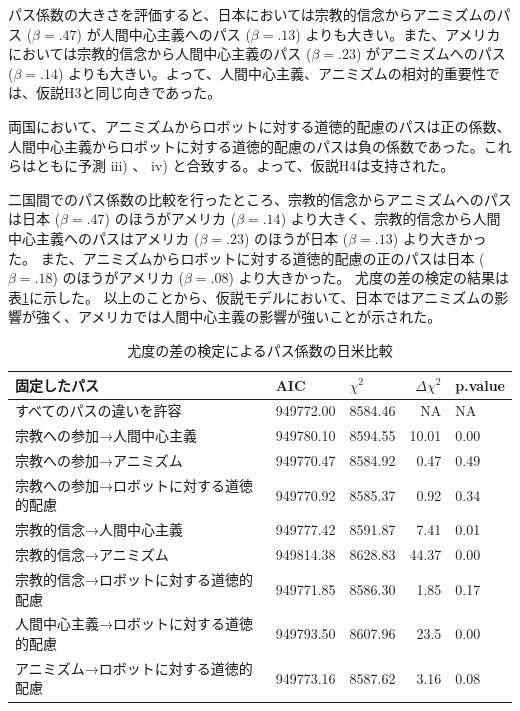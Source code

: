 \documentclass[a4j,12pt]{jreport}
\begin{document}
パス係数の大きさを評価すると、日本においては宗教的信念からアニミズムのパス ($\beta=.47$) が人間中心主義へのパス ($\beta=.13$) よりも大きい。また、アメリカにおいては宗教的信念から人間中心主義のパス ($\beta=.23$) がアニミズムへのパス ($\beta=.14$) よりも大きい。よって、人間中心主義、アニミズムの相対的重要性では、仮説H3と同じ向きであった。



両国において、アニミズムからロボットに対する道徳的配慮のパスは正の係数、人間中心主義からロボットに対する道徳的配慮のパスは負の係数であった。これらはともに予測 iii) 、 iv) と合致する。よって、仮説H4は支持された。



二国間でのパス係数の比較を行ったところ、宗教的信念からアニミズムへのパスは日本 ($\beta=.47$) のほうがアメリカ ($\beta=.14$) より大きく、宗教的信念から人間中心主義へのパスはアメリカ ($\beta=.23$) のほうが日本 ($\beta=.13$) より大きかった。
また、アニミズムからロボットに対する道徳的配慮の正のパスは日本 ($\beta=.18$) のほうがアメリカ ($\beta=.08$) より大きかった。
尤度の差の検定の結果は表\ref{tab:SEMPathComp}に示した。
以上のことから、仮説モデルにおいて、日本ではアニミズムの影響が強く、アメリカでは人間中心主義の影響が強いことが示された。


\begin{table}[H]
\centering
\caption[パス係数の日米比較]{尤度の差の検定によるパス係数の日米比較}
\label{tab:SEMPathComp}
\begin{tabular}{@{}lllrl@{}}
\toprule
    固定したパス          & AIC       & $\chi^2$ & $\Delta \chi^2$ & p.value \\ \midrule
すべてのパスの違いを許容 & 949772.00 & 8584.46 & NA          & NA      \\
宗教への参加→人間中心主義   & 949780.10 & 8594.55 & 10.01  & 0.00    \\
宗教への参加→アニミズム & 949770.47 & 8584.92 & ~0.47  & 0.49    \\
宗教への参加→ロボットに対する道徳的配慮 & 949770.92 & 8585.37 & ~0.92  & 0.34    \\
宗教的信念→人間中心主義 & 949777.42 & 8591.87 & ~7.41  & 0.01    \\
宗教的信念→アニミズム & 949814.38 & 8628.83 & 44.37       & 0.00    \\
宗教的信念→ロボットに対する道徳的配慮 & 949771.85 & 8586.30 & ~1.85  & 0.17    \\
人間中心主義→ロボットに対する道徳的配慮 & 949793.50 & 8607.96 & 23.5       & 0.00    \\
アニミズム→ロボットに対する道徳的配慮 & 949773.16 & 8587.62 & ~3.16  & 0.08    \\ \bottomrule
\end{tabular}
\end{table}
\end{document}
